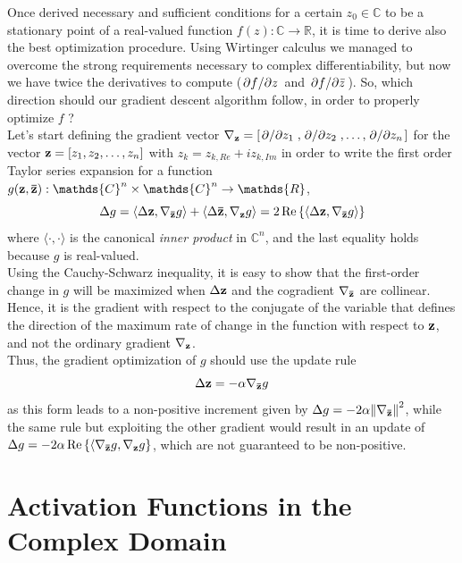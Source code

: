 \documentclass[../main.tex]{subfiles}
\begin{document}
Once derived necessary and sufficient conditions for a certain $z_0\in\mathds{C}$ to be a stationary point of a real-valued function $f(z):\mathds{C}\to\mathds{R}$, it is time to derive also the best optimization procedure. Using Wirtinger calculus we managed to overcome the strong requirements necessary to complex differentiability, but now we have twice the derivatives to compute ($\pdv*{f}{z}$ and $\pdv*{f}{\bar{z}}$). So, which direction should our gradient descent algorithm follow, in order to properly optimize $f$ \cite{Hualiang_nonlinear}?\\
Let's start defining the gradient vector $\nabla_{\vb{z}} = \left[\pdv*{z_1}, \pdv*{z_2},\dots,\pdv*{z_n}\right]$ for the vector $\vb{z}=\left[z_1, z_2, \dots, z_n\right]$ with $z_k = z_{k,Re} + iz_{k,Im}$ in order to write the first order Taylor series expansion for a function $g(\vb{z}, \vb{\bar{z}}):\mathds{C}^n\times\mathds{C}^n\to\mathds{R}$,
\[ \Delta g = \langle \Delta \vb{z}, \nabla_{\vb{\bar{z}}}g \rangle + \langle \Delta \vb{\bar{z}}, \nabla_{\vb{z}}g \rangle = 2\Re\left\{\langle \Delta \vb{z}, \nabla_{\vb{\bar{z}}}g \rangle\right\} \]
where $\langle\cdot,\cdot\rangle$ is the canonical \textit{inner product} in $\mathds{C}^n$, and the last equality holds because $g$ is real-valued.\\
Using the Cauchy-Schwarz inequality, it is easy to show that the first-order change in $g$ will be maximized when $\Delta\vb{z}$ and the cogradient $\nabla_{\vb{\bar{z}}}$ are collinear. Hence, it is the gradient with respect to the conjugate of the variable that defines the direction of the maximum rate of change in the function with respect to $\vb{z}$, and not the ordinary gradient $\nabla_{\vb{z}}$.\\
Thus, the gradient optimization of $g$ should use the update rule
\[ \Delta \vb{z} = -\alpha\nabla_{\vb{\bar{z}}}g \]
as this form leads to a non-positive increment given by $\Delta g = -2\alpha\norm{\nabla_{\vb{\bar{z}}}}^2$, while the same rule but exploiting the other gradient would result in an update of $\Delta g = -2\alpha\Re\left\{\langle\nabla_{\vb{\bar{z}}}g, \nabla_{\vb{z}}g\right\}$, which are not guaranteed to be non-positive.


\chapter{Activation Functions in the Complex Domain}
\label{app:activations}
\end{document}

